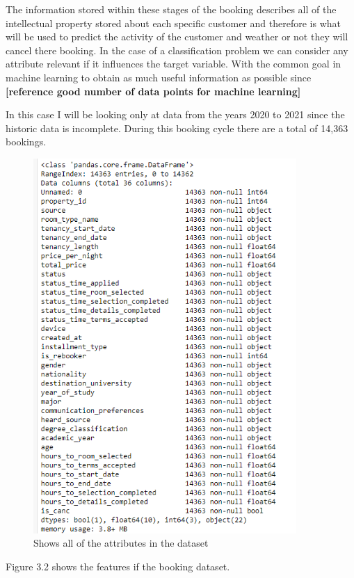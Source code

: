 \vspace{5mm}

The information stored within these stages of the booking describes all of the intellectual property stored about each specific customer and therefore is what will be used to predict the activity of the customer and weather or not they will cancel there booking. In the case of a classification problem we can consider any attribute relevant if it influences the target variable. With the common goal in machine learning to obtain as much useful information as possible since \textbf{[reference good number of data points for machine learning]}

In this case I will be looking only at data from the years 2020 to 2021 since the historic data is incomplete. During this booking cycle there are a total of 14,363 bookings.

\begin{figure}[hbt!]
 \includegraphics[width=10cm]{figures/df_info.png}
 \caption{Shows all of the attributes in the dataset}
\end{figure}

Figure 3.2 shows the features if the booking dataset. 


